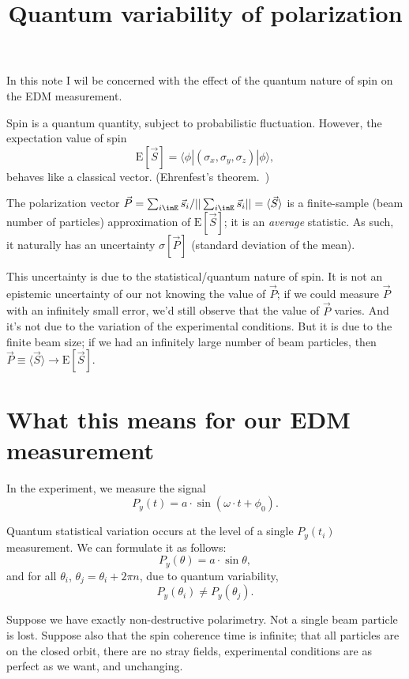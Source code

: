 \documentclass[a4paper,14pt]{article}
\newcommand{\avg}[1]{\langle {#1} \rangle}
\newcommand{\xp}[1]{\mathrm{E}\left[{#1}\right]}
\begin{document}
\title{Quantum variability of polarization}
\maketitle{}

In this note I wil be concerned with the effect of the quantum nature of spin on the EDM measurement.

Spin is a quantum quantity, subject to probabilistic fluctuation. However, the expectation value of spin
\[
\xp{\vec S} = \langle\phi|(\sigma_x, \sigma_y, \sigma_z)|\phi\rangle,
\]
behaves like a classical vector. (Ehrenfest's theorem.~\cite{Ehrenfest})

The polarization vector $\vec P = {\sum_{i\inE} \vec s_i}/{||\sum_{i\inE} \vec s_i||} = \avg{\vec S}$ is a
finite-sample (beam number of particles) approximation of $\xp{\vec S}$; it is an \emph{average} statistic.
As such, it naturally has an uncertainty $\sigma[\vec P]$ (standard deviation of the mean).

This uncertainty is due to the statistical/quantum nature of spin.
It is not an epistemic uncertainty of our not knowing the value of $\vec P$;
if we could measure $\vec P$ with an infinitely small error,
we'd still observe that the value of $\vec P$ varies. And it's not due to the variation of the
experimental conditions. But it is due to the finite beam size; if we had an infinitely large number
of beam particles, then $\vec P \equiv \avg{\vec S} \to \xp{\vec S}$.

\section{What this means for our EDM measurement}
In the experiment, we measure the signal
\[
P_y(t) = a\cdot \sin(\omega\cdot t + \phi_0).
\]

Quantum statistical variation occurs at the level of a single $P_y(t_i)$ measurement.
We can formulate it as follows:
\[
P_y(\theta) = a\cdot \sin\theta,
\]
and for all $\theta_i$, $\theta_j = \theta_i + 2\pi n$, due to quantum variability,
\begin{equation}\label{eq:main}
P_y(\theta_i) \neq P_y(\theta_j).
\end{equation}

Suppose we have exactly non-destructive polarimetry. Not a single beam particle is lost. Suppose also that
the spin coherence time is infinite; that all particles are on the closed orbit, there are no stray fields,
experimental conditions are as perfect as we want, and unchanging.
\end{document}
